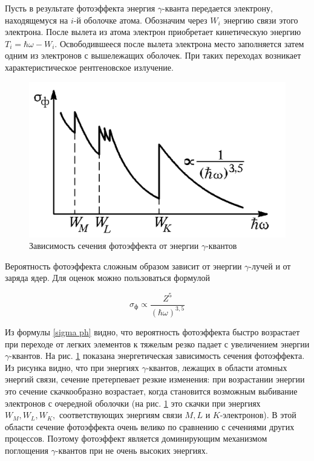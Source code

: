 \documentclass[12pt]{kiarticle}
\newcommand{\ga}{\ensuremath{\gamma}}
\begin{document}
	Пусть в результате фотоэффекта энергия \ga-кванта передается
	электрону, находящемуся на $ i $-й оболочке атома. Обозначим через $ W_i $
	энергию связи этого электрона. После вылета из атома электрон приобретает кинетическую энергию $ T_i = \hbar \omega - W_i $.
	Освободившееся после вылета электрона место заполняется затем
	одним из электронов с вышележащих оболочек. При таких переходах
	возникает характеристическое рентгеновское излучение.
	
	\begin{figure}
		\includegraphics[width=\linewidth]{photo}
		\caption{Зависимость сечения фотоэффекта от энергии \ga-квантов}
		\label{ris photo}
	\end{figure}
	
	Вероятность фотоэффекта сложным образом зависит от энергии
	\ga-лучей и от заряда ядер. Для оценок можно пользоваться формулой
	
	\begin{equation}\label{sigma ph}
	\sigma_ф \propto \dfrac{Z^5}{(\hbar\omega)^{3,5}}
	\end{equation}
	
	Из формулы \eqref{sigma ph} видно, что вероятность фотоэффекта быстро возрастает при переходе от легких элементов к тяжелым резко падает с увеличением энергии \ga-квантов. На рис. \ref{ris photo} показана энергетическая зависимость сечения фотоэффекта. Из рисунка видно, что при энергиях \ga-квантов, лежащих в области атомных энергий связи, сечение претерпевает резкие изменения: при возрастании энергии это сечение скачкообразно возрастает, когда становится возможным выбивание электронов с очередной оболочки (на рис. \ref{ris photo} это скачки при энергиях $ W_M, W_L, W_K, $ соответствующих энергиям связи $ M, L $  и $ K $-электронов). В этой области сечение фотоэффекта очень велико по сравнению с сечениями других процессов. Поэтому фотоэффект является доминирующим механизмом поглощения \ga-квантов при не очень высоких энергиях.
	
\end{document}
